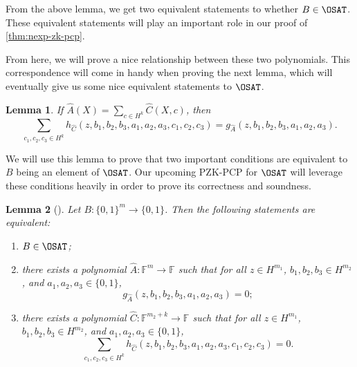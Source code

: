 \documentclass[english,12pt]{reedthesis}
\theoremstyle{plain}
\newtheorem{lemma}[lemma]{Lemma}
\theoremstyle{definition}
\theoremstyle{remark}
\begin{document}
From the above lemma, we get two equivalent statements to whether $B \in \OSAT$.
These equivalent statements will play an important role in our proof of
\cref{thm:nexp-zk-pcp}.

From here, we will prove a nice relationship between these two polynomials.
This correspondence will come in handy when proving the next lemma, which will
eventually give us some nice equivalent statements to $\OSAT$.

\begin{lemma}\label{lem:g_a-vs-h_c}
  If $\hat{A}(X) = \sum_{c \in H^{k}}\hat{C}(X, c)$, then
  \begin{equation}\label{eqn:g_a-vs-h_c}
    \sum_{c_{1}, c_{2}, c_{3} \in H^{k}}h_{\hat{C}}(z, b_{1}, b_{2}, b_{3}, a_{1}, a_{2}, a_{3}, c_{1}, c_{2}, c_{3})
    = g_{\hat{A}}(z, b_{1}, b_{2}, b_{3}, a_{1}, a_{2}, a_{3}).
  \end{equation}
\end{lemma}

We will use this lemma to prove that two important conditions are equivalent to
$B$ being an element of $\OSAT$. Our upcoming PZK-PCP for $\OSAT$ will leverage
these conditions heavily in order to prove its correctness and soundness.

\begin{lemma}[{\cite[Claim 6.5]{GOS25}}]\label{lem:three-equiv}
  Let $B\colon \{0, 1\}^{m} \rightarrow \{0, 1\}$. Then the following statements are
  equivalent:
  \begin{enumerate}
    \item\label{item:b-in-osat} $B \in \OSAT$;
    \item\label{item:exists-a} there exists a polynomial
          $\hat{A}\colon \mathbb{F}^{m} \rightarrow \mathbb{F}$ such that for all
          $z \in H^{m_{1}}$, $b_{1}, b_{2}, b_{3} \in H^{m_{2}}$, and
          $a_{1}, a_{2}, a_{3} \in \{0, 1\}$,
          \begin{equation}
            g_{\hat{A}}(z, b_{1}, b_{2}, b_{3}, a_{1}, a_{2}, a_{3}) = 0;
          \end{equation}
    \item\label{item:exists-c} there exists a polynomial
          $\hat{C}\colon \mathbb{F}^{m_{2}+k} \rightarrow \mathbb{F}$ such that for all
          $z \in H^{m_{1}}$, $b_{1}, b_{2}, b_{3} \in H^{m_{2}}$, and
          $a_{1}, a_{2}, a_{3} \in \{0, 1\}$,
          \begin{equation}
            \sum_{c_{1}, c_{2}, c_{3} \in H^{k}}h_{\hat{C}}(z, b_{1}, b_{2}, b_{3}, a_{1}, a_{2}, a_{3}, c_{1}, c_{2}, c_{3}) = 0.
          \end{equation}
  \end{enumerate}
\end{lemma}
\end{document}

